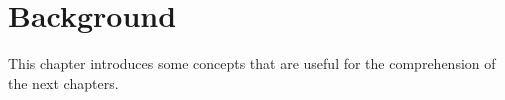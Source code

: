 \chapter{Background} 
This chapter introduces some concepts that are useful for the comprehension of the next chapters.

 








